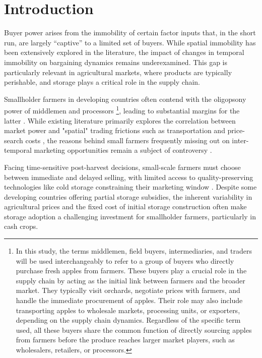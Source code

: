 \documentclass[12pt,authoryear, notitlepage]{elegantpaper}
\begin{document}

\section{Introduction}
\noindent    Buyer power arises from the immobility of certain factor inputs that, in the short run, are largely “captive” to a limited set of buyers. While spatial immobility has been extensively explored in the literature, the impact of changes in temporal immobility on bargaining dynamics remains underexamined. This gap is particularly relevant in agricultural markets, where products are typically perishable, and storage plays a critical role in the supply chain.

Smallholder farmers in developing countries often contend with the oligopsony power of middlemen and processors \footnote{In this study, the terms middlemen, field buyers, intermediaries, and traders will be used interchangeably to refer to a group of buyers who directly purchase fresh apples from farmers. These buyers play a crucial role in the supply chain by acting as the initial link between farmers and the broader market. They typically visit orchards, negotiate prices with farmers, and handle the immediate procurement of apples. Their role may also include transporting apples to wholesale markets, processing units, or exporters, depending on the supply chain dynamics. Regardless of the specific term used, all these buyers share the common function of directly sourcing apples from farmers before the produce reaches larger market players, such as wholesalers, retailers, or processors.}, leading to substantial margins for the latter \citep{rogers_rich_1994assessing}. While existing literature primarily explores the correlation between market power and "spatial" trading frictions such as transportation and price-search costs \citep{bergquist_dinerstein_2020,mitra_mookherjee_torero_visaria_2018,ranjan_2017,antras_costinot_2011}, the reasons behind small farmers frequently missing out on inter-temporal marketing opportunities remain a subject of controversy \citep{williams1991storage, wright1984welfare, ruhinduka2020smallholder, lai2003optimal}.

Facing time-sensitive post-harvest decisions, small-scale farmers must choose between immediate and delayed selling, with limited access to quality-preserving technologies like cold storage constraining their marketing window \citep{aggarwal2018grain}. Despite some developing countries offering partial storage subsidies, the inherent variability in agricultural prices and the fixed cost of initial storage construction often make storage adoption a challenging investment for smallholder farmers, particularly in cash crops.
\end{document}
